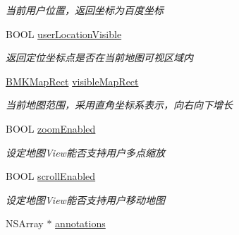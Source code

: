\begin{DoxyCompactItemize}
\begin{DoxyCompactList}\small\item\em 当前用户位置，返回坐标为百度坐标 \end{DoxyCompactList}\item 
\hypertarget{interface_b_m_k_map_view_a8e3facab242ecd1ea2aadea90c158b99}{B\-O\-O\-L \hyperlink{interface_b_m_k_map_view_a8e3facab242ecd1ea2aadea90c158b99}{user\-Location\-Visible}}\label{interface_b_m_k_map_view_a8e3facab242ecd1ea2aadea90c158b99}

\begin{DoxyCompactList}\small\item\em 返回定位坐标点是否在当前地图可视区域内 \end{DoxyCompactList}\item 
\hypertarget{interface_b_m_k_map_view_a35576ab39592ef50d1190c2b672c0923}{\hyperlink{struct_b_m_k_map_rect}{B\-M\-K\-Map\-Rect} \hyperlink{interface_b_m_k_map_view_a35576ab39592ef50d1190c2b672c0923}{visible\-Map\-Rect}}\label{interface_b_m_k_map_view_a35576ab39592ef50d1190c2b672c0923}

\begin{DoxyCompactList}\small\item\em 当前地图范围，采用直角坐标系表示，向右向下增长 \end{DoxyCompactList}\item 
\hypertarget{interface_b_m_k_map_view_acf8472da994b76cef21a40673a41f774}{B\-O\-O\-L \hyperlink{interface_b_m_k_map_view_acf8472da994b76cef21a40673a41f774}{zoom\-Enabled}}\label{interface_b_m_k_map_view_acf8472da994b76cef21a40673a41f774}

\begin{DoxyCompactList}\small\item\em 设定地图\-View能否支持用户多点缩放 \end{DoxyCompactList}\item 
\hypertarget{interface_b_m_k_map_view_adc7ae3120b0edf096ac0eb42f13ed93a}{B\-O\-O\-L \hyperlink{interface_b_m_k_map_view_adc7ae3120b0edf096ac0eb42f13ed93a}{scroll\-Enabled}}\label{interface_b_m_k_map_view_adc7ae3120b0edf096ac0eb42f13ed93a}

\begin{DoxyCompactList}\small\item\em 设定地图\-View能否支持用户移动地图 \end{DoxyCompactList}\item 
\hypertarget{interface_b_m_k_map_view_a4d6a0d91974378d36f8da982e3eb85e8}{N\-S\-Array $\ast$ \hyperlink{interface_b_m_k_map_view_a4d6a0d91974378d36f8da982e3eb85e8}{annotations}}\label{interface_b_m_k_map_view_a4d6a0d91974378d36f8da982e3eb85e8}


\end{DoxyCompactItemize}
